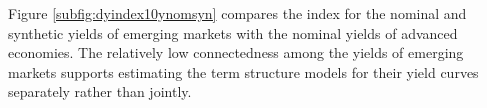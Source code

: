 Figure \ref{subfig:dyindex10ynomsyn} compares the index for the nominal and synthetic yields of emerging markets with the nominal yields of advanced economies. %
The relatively low connectedness among the yields of emerging markets %
supports estimating the term structure models for their yield curves separately rather than jointly.
